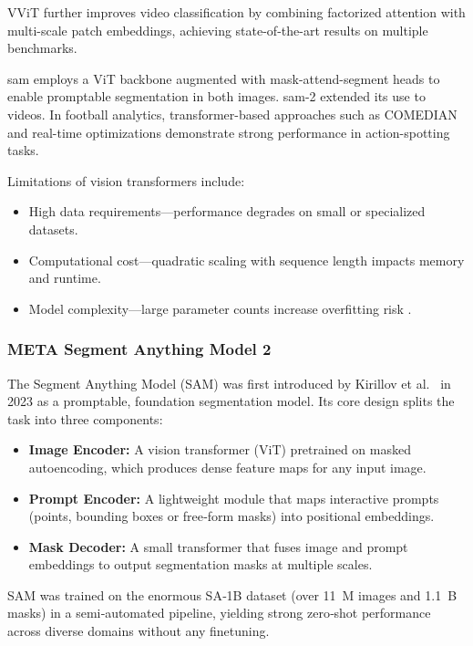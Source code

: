 VViT \cite{arnab_vvit_2021} further improves video classification by combining factorized attention with multi-scale patch embeddings, achieving state-of-the-art results on multiple benchmarks.

\acrfull{sam} \cite{kirillov_segment_2023} employs a ViT backbone augmented with mask-attend-segment heads to enable promptable segmentation in both images. \acrlong{sam}-2 \cite{ravi_sam_nodate} extended its use to videos. In football analytics, transformer-based approaches such as COMEDIAN \cite{denize_comedian_2024} and real-time optimizations \cite{sarraf_optimal_2023} demonstrate strong performance in action-spotting tasks.

Limitations of vision transformers include:
\begin{itemize}

    \item High data requirements—performance degrades on small or specialized datasets.  
    \item Computational cost—quadratic scaling with sequence length impacts memory and runtime.  
    \item Model complexity—large parameter counts increase overfitting risk \cite{lee_enhancing_mamba_s6_2024}.
\end{itemize}

\subsubsection{META Segment Anything Model 2}
\label{ssec:meta_sam2}

The Segment Anything Model (SAM) was first introduced by Kirillov et al.\ \cite{kirillov_segment_2023} in 2023 as a promptable, foundation segmentation model.  Its core design splits the task into three components:
\begin{itemize}
    \item \textbf{Image Encoder:} A vision transformer (ViT) pretrained on masked autoencoding, which produces dense feature maps for any input image.
    \item \textbf{Prompt Encoder:} A lightweight module that maps interactive prompts (points, bounding boxes or free‐form masks) into positional embeddings.
    \item \textbf{Mask Decoder:} A small transformer that fuses image and prompt embeddings to output segmentation masks at multiple scales.
\end{itemize}
SAM was trained on the enormous SA‑1B dataset (over 11 M images and 1.1 B masks) in a semi‑automated pipeline, yielding strong zero‑shot performance across diverse domains without any finetuning.

